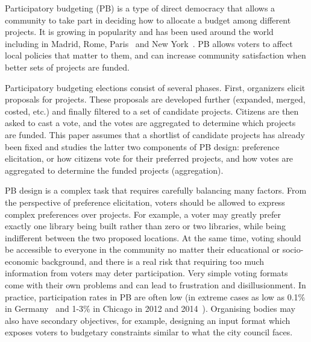\documentclass[runningheads]{llncs}
\newcommand{\kibitz}[2]{\ifnum\Comments=1{\color{#1}{#2}}\fi}
\newcommand{\rf}[1]{\kibitz{blue}{[Roy says:#1]}}
\newcommand{\kg}[1]{\kibitz{red}{[Kobi says:#1]}}
\newcommand{\gb}[1]{\kibitz{brown}{[GB:#1]}}
\begin{document}
Participatory budgeting (PB) is a type of direct democracy that allows a community to take part in deciding how to allocate a budget among different projects. It is growing in popularity and has been used around the world including in Madrid, Rome, Paris~\citep{sintomer2008participatory} and New York~\citep{su2017porto}.  
PB allows voters to affect local policies that matter to them, and  can increase community satisfaction when  better sets of projects are funded. \kg{does there exist work on satisfaction of public?}


Participatory budgeting elections consist of several phases. First, organizers elicit proposals for  projects. These proposals are developed further (expanded, merged, costed, etc.) and finally filtered to a set of candidate projects.  Citizens are then asked to cast a vote, and the votes are aggregated to determine which projects are funded. 
This paper assumes that a shortlist of candidate projects has already been fixed and studies the latter two components  of PB design: preference elicitation, or
how citizens vote  for their preferred projects,  and how votes are aggregated to determine the funded projects (aggregation). 
 
 PB  design is a complex task that   requires carefully balancing many factors. From the perspective of preference elicitation,   voters should be allowed to express complex preferences over projects.  For example, a voter may greatly prefer exactly one library being built rather than zero or two libraries, while being indifferent between the two proposed locations. At the same time, voting should be accessible to everyone in the community no matter their educational or socio-economic background, and there is a real risk that requiring too much information from voters may deter   participation. 
Very simple voting formats   come with their own problems and can lead to frustration and disillusionment. %
In practice,   participation rates in PB are often low  (in extreme cases as low as 0.1\% in Germany~\citep{zepic2017participatory} and 1-3\%   in Chicago in 2012 and 2014~\citep{stewart2014participatory,carroll2016democratizing}). %
Organising bodies  may also have secondary objectives, for example, designing an input format which exposes voters to   budgetary constraints similar to what the city council faces.
\end{document}
